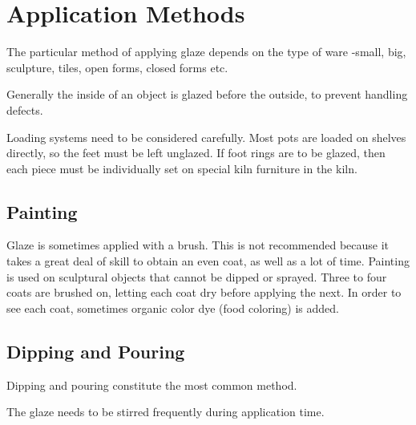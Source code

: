 \section{Application Methods}
The particular method of applying glaze depends on the type of ware -small, 
big, sculpture, tiles, open forms, closed forms etc.

Generally the inside of an object is glazed before the outside, to prevent 
handling defects.

Loading systems need to be considered carefully. Most pots are loaded on 
shelves directly, so the feet must be left unglazed. If foot rings are to be 
glazed, then each piece must be individually set on special kiln furniture in 
the kiln.
\subsection{Painting}
Glaze is sometimes applied with a brush. This is not recommended because it 
takes a great deal of skill to obtain an even coat, as well as a lot of time. 
Painting is used on sculptural objects that cannot be dipped or sprayed. Three 
to four coats are brushed on, letting each coat dry before applying the next. 
In order to see each coat, sometimes organic color dye (food coloring) is added.
\subsection{Dipping and Pouring}
Dipping and pouring constitute the most common method.

The glaze needs to be stirred frequently during application time.
